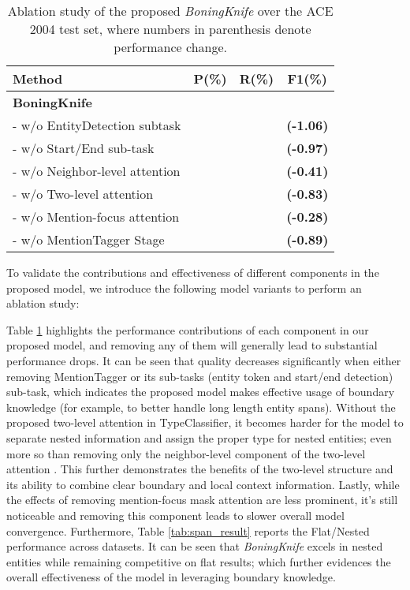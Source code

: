 \documentclass[11pt,a4paper]{article}
\begin{document}
\begin{table}[htbp]
\centering
\vskip 0.1in
\begin{tabular}{@{}lccc@{}}
\toprule
\textbf{Method} & \textbf{P}(\%) & \textbf{R}(\%) & \textbf{F1}(\%) \\ \midrule
\textbf{BoningKnife}          & &  &  \\
- w/o EntityDetection subtask  & &  &  \bf{(-1.06)} \\
- w/o Start/End sub-task & &  &  \bf{(-0.97)} \\
- w/o Neighbor-level attention   & &  &  \bf{(-0.41)} \\
- w/o Two-level attention   & &  &  \bf{(-0.83)} \\
- w/o Mention-focus attention   & &  &  \bf{(-0.28)} \\
- w/o MentionTagger Stage\footnotemark & &  &  \bf{(-0.89)} \\
\bottomrule
\end{tabular}\caption{Ablation study of the proposed \textit{BoningKnife} over the ACE 2004 test set, where numbers in parenthesis denote performance change.}
\label{table:ablation}
\end{table} 
To validate the contributions and effectiveness of different components in
the proposed model, we introduce the following model variants to perform an ablation study:



Table \ref{table:ablation} highlights the performance contributions of each
component in our proposed model, and removing any of them will generally lead to substantial performance drops.
It can be seen that quality decreases significantly when either removing MentionTagger or its sub-tasks (entity token and start/end detection) sub-task, which indicates the proposed model makes effective usage of boundary knowledge (for example, to better handle long length entity spans).
Without the proposed two-level attention in TypeClassifier, it becomes 
harder for the model to separate nested information and assign the proper type for nested entities; even more so than removing only the neighbor-level component of the two-level attention . This further demonstrates the benefits of the two-level structure and its ability to combine clear boundary and local context information.
Lastly, while the effects of removing mention-focus mask attention are less prominent, it's still noticeable and removing this component leads to slower overall model convergence.
Furthermore, Table \ref{tab:span_result} reports the Flat/Nested performance across datasets. It can be seen that \textit{BoningKnife} excels in nested entities while remaining competitive on flat results; which further evidences the overall effectiveness of the model in leveraging boundary knowledge.
\end{document}
